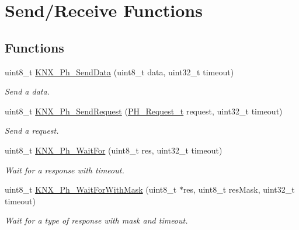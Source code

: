 \hypertarget{group___k_n_x___p_h___sup___exported___functions___group2}{}\section{Send/\+Receive Functions}
\label{group___k_n_x___p_h___sup___exported___functions___group2}
\subsection*{Functions}
\begin{DoxyCompactItemize}
\item 
uint8\+\_\+t \hyperlink{group___k_n_x___p_h___sup___exported___functions___group2_ga99d547995ed3a2a7331d1f074197ab4b}{K\+N\+X\+\_\+\+Ph\+\_\+\+Send\+Data} (uint8\+\_\+t data, uint32\+\_\+t timeout)
\begin{DoxyCompactList}\small\item\em Send a data. \end{DoxyCompactList}\item 
uint8\+\_\+t \hyperlink{group___k_n_x___p_h___sup___exported___functions___group2_gaa5ea5dc9e0a18257244faa3c2d29f1b8}{K\+N\+X\+\_\+\+Ph\+\_\+\+Send\+Request} (\hyperlink{group___k_n_x___p_h___sup___exported___types_ga78f5bed722457f025cbc6786d5730d3e}{P\+H\+\_\+\+Request\+\_\+t} request, uint32\+\_\+t timeout)
\begin{DoxyCompactList}\small\item\em Send a request. \end{DoxyCompactList}\item 
uint8\+\_\+t \hyperlink{group___k_n_x___p_h___sup___exported___functions___group2_ga5c5b1af8b0ba06771d5b16fee4547f87}{K\+N\+X\+\_\+\+Ph\+\_\+\+Wait\+For} (uint8\+\_\+t res, uint32\+\_\+t timeout)
\begin{DoxyCompactList}\small\item\em Wait for a response with timeout. \end{DoxyCompactList}\item 
uint8\+\_\+t \hyperlink{group___k_n_x___p_h___sup___exported___functions___group2_ga4bede9df3610d29290973ac067ac93ae}{K\+N\+X\+\_\+\+Ph\+\_\+\+Wait\+For\+With\+Mask} (uint8\+\_\+t $\ast$res, uint8\+\_\+t res\+Mask, uint32\+\_\+t timeout)
\begin{DoxyCompactList}\small\item\em Wait for a type of response with mask and timeout. \end{DoxyCompactList}\end{DoxyCompactItemize}


